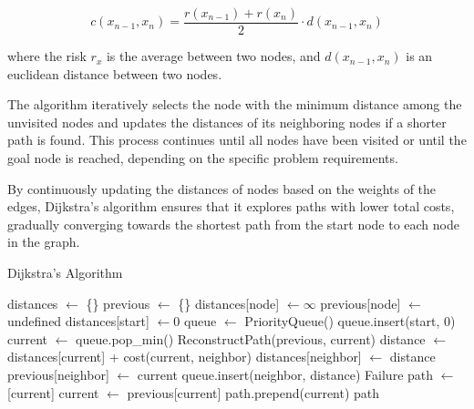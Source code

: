 \documentclass[12pt]{report}
\begin{document}
        \begin{equation}
        c(x_{n-1}, x_n) = \frac{r(x_{n-1}) + r(x_n)}{2} \cdot d(x_{n-1}, x_n)
        \end{equation}
        
        where the risk $r_x$ is the average between two nodes, and $d(x_{n-1}, x_n)$ is an euclidean distance between
        two nodes.
        
        The algorithm iteratively selects the node with the minimum distance among the unvisited nodes and updates the
        distances of its neighboring nodes if a shorter path is found. This process continues until all nodes have been
        visited or until the goal node is reached, depending on the specific problem requirements.

        By continuously updating the distances of nodes based on the weights of the edges, Dijkstra's algorithm ensures
        that it explores paths with lower total costs, gradually converging towards the shortest path from the start
        node to each node in the graph.

        \begin{algorithm}
        \caption{Dijkstra’s Algorithm}
        \begin{algorithmic}[1]
            \State distances $\gets$ \{\}
            \State previous $\gets$ \{\}
                \State distances[node] $\gets \infty$
                \State previous[node] $\gets$ undefined
            \EndFor
            \State distances[start] $\gets 0$
            \State queue $\gets$ PriorityQueue()
            \State queue.insert(start, 0)
                \State current $\gets$ queue.pop\_min()
                    \State \Return ReconstructPath(previous, current)
                \EndIf
                    \State distance $\gets$ distances[current] + cost(current, neighbor)
                        \State distances[neighbor] $\gets$ distance
                        \State previous[neighbor] $\gets$ current
                        \State queue.insert(neighbor, distance)
                    \EndIf
                \EndFor
            \EndWhile
            \State \Return Failure
        \EndFunction
        \Statex
            \State path $\gets$ [current]
                \State current $\gets$ previous[current]
                \State path.prepend(current)
            \EndWhile
            \State \Return path
        \EndFunction
        \end{algorithmic}
        \end{algorithm}
\end{document}
